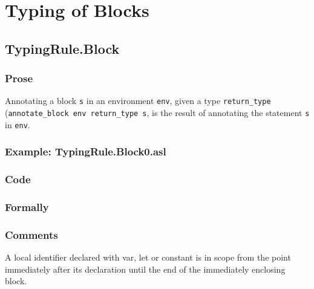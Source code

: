 \documentclass{book}
\begin{document}

\chapter{Typing of Blocks}

\section{TypingRule.Block \label{sec:TypingRule.Block}}
    
  \subsection{Prose}
    Annotating a block \texttt{s} in an environment \texttt{env}, given a type
\texttt{return\_type} (\texttt{annotate\_block env return\_type s}, is the
result of annotating the statement \texttt{s} in \texttt{env}.
   
  \subsection{Example: TypingRule.Block0.asl}

  \subsection{Code}

\begin{emptyformal}
    \subsection{Formally}
\end{emptyformal}

\subsection{Comments}
    A local identifier declared with var, let or constant is in scope
from the point immediately after its declaration until the end of the
immediately enclosing block.
\end{document}
